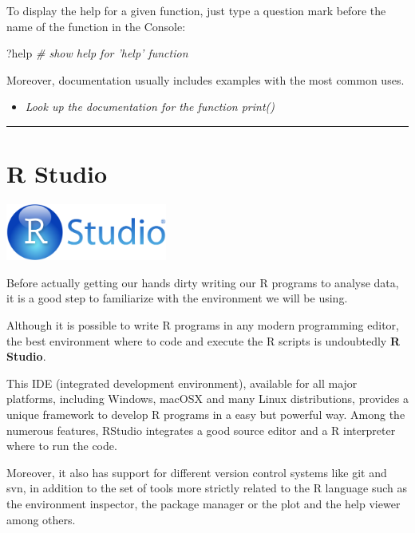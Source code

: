 \documentclass[]{article}
\newenvironment{Shaded}{\begin{snugshade}}{\end{snugshade}}
\newcommand{\CommentTok}[1]{\textcolor[rgb]{0.56,0.35,0.01}{\textit{#1}}}
\newcommand{\NormalTok}[1]{#1}
\providecommand{\tightlist}{%
  \setlength{\itemsep}{0pt}\setlength{\parskip}{0pt}}
\begin{document}
To display the help for a given function, just type a question mark
before the name of the function in the Console:

\begin{Shaded}
\begin{Highlighting}[]
\NormalTok{?help}
\CommentTok{# show help for 'help' function}
\end{Highlighting}
\end{Shaded}

Moreover, documentation usually includes examples with the most common
uses.

\begin{itemize}
\tightlist
\item
  \emph{Look up the documentation for the function print()}
\end{itemize}

\begin{center}\rule{0.5\linewidth}{\linethickness}\end{center}

\section{R Studio}\label{r-studio}

\begin{center}\includegraphics[width=200px]{figures/RStudio-Logo-Blue-Gradient} \end{center}

Before actually getting our hands dirty writing our R programs to
analyse data, it is a good step to familiarize with the environment we
will be using.

Although it is possible to write R programs in any modern programming
editor, the best environment where to code and execute the R scripts is
undoubtedly \textbf{R Studio}.

This IDE (integrated development environment), available for all major
platforms, including Windows, macOSX and many Linux distributions,
provides a unique framework to develop R programs in a easy but powerful
way. Among the numerous features, RStudio integrates a good source
editor and a R interpreter where to run the code.

Moreover, it also has support for different version control systems like
git and svn, in addition to the set of tools more strictly related to
the R language such as the environment inspector, the package manager or
the plot and the help viewer among others.
\end{document}
